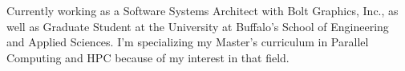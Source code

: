 

\begin{cvparagraph}

Currently working as a Software Systems Architect with Bolt Graphics, Inc., as well as Graduate Student at the University at Buffalo's School of Engineering and Applied Sciences. I'm specializing my Master's curriculum in Parallel Computing and HPC because of my interest in that field.
\end{cvparagraph}
